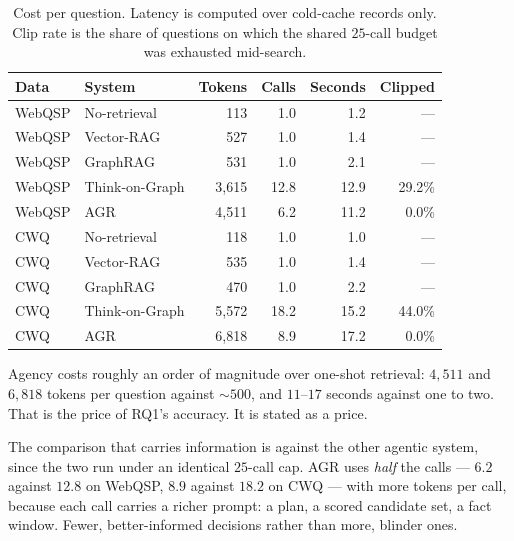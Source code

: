\begin{table}[!tb]
  \begin{center}
    \caption[Cost per question]{Cost per question. Latency is computed over
    cold-cache records only. Clip rate is the share of questions on which the
    shared $25$-call budget was exhausted mid-search.}
    \label{tab:efficiency}
    \small
    \begin{tabular}{|l|l|r|r|r|r|}
      \hline
      \textbf{Data} & \textbf{System} & \textbf{Tokens} & \textbf{Calls} &
      \textbf{Seconds} & \textbf{Clipped} \\
      \hline
      WebQSP & No-retrieval   & 113   & 1.0  & 1.2  & --- \\
      WebQSP & Vector-RAG     & 527   & 1.0  & 1.4  & --- \\
      WebQSP & GraphRAG       & 531   & 1.0  & 2.1  & --- \\
      WebQSP & Think-on-Graph & 3{,}615 & 12.8 & 12.9 & 29.2\% \\
      WebQSP & AGR            & 4{,}511 & 6.2  & 11.2 & 0.0\% \\
      \hline
      CWQ & No-retrieval   & 118   & 1.0  & 1.0  & --- \\
      CWQ & Vector-RAG     & 535   & 1.0  & 1.4  & --- \\
      CWQ & GraphRAG       & 470   & 1.0  & 2.2  & --- \\
      CWQ & Think-on-Graph & 5{,}572 & 18.2 & 15.2 & 44.0\% \\
      CWQ & AGR            & 6{,}818 & 8.9  & 17.2 & 0.0\% \\
      \hline
    \end{tabular}
  \end{center}
\end{table}

Agency costs roughly an order of magnitude over one-shot retrieval: $4{,}511$
and $6{,}818$ tokens per question against $\sim 500$, and
$11$--$17$ seconds against one to two. That is the price of RQ1's accuracy. It
is stated as a price.

The comparison that carries information is against the other agentic system,
since the two run under an identical $25$-call cap. AGR uses \emph{half} the
calls --- $6.2$ against $12.8$ on WebQSP, $8.9$ against $18.2$ on CWQ --- with
more tokens per call, because each call carries a richer prompt: a plan, a
scored candidate set, a fact window. Fewer, better-informed decisions rather
than more, blinder ones.

